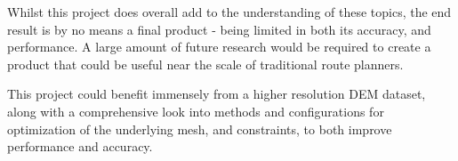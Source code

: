 \documentclass[12pt]{article}
\begin{document}
Whilst this project does overall add to the understanding of these topics, the end result is by no means a final product - being limited in both its accuracy, and performance. A large amount of future research would be required to create a product that could be useful near the scale of traditional route planners.

This project could benefit immensely from a higher resolution DEM dataset, along with a comprehensive look into methods and configurations for optimization of the underlying mesh, and constraints, to both improve performance and accuracy.

\pagebreak

\nocite{esa2024dem}
\nocite{cgal:eb-24b}
\nocite{rouault_2022_6517191}
\nocite{wiki:osm}
\nocite{gtest}
\nocite{fmtlib}
\nocite{opencv_library}
\nocite{oneTBB}
\nocite{tin_terrain_logging}
\nocite{libboost}
\nocite{geographiclib}

\printbibliography[heading=bibnumbered]{}
\end{document}

